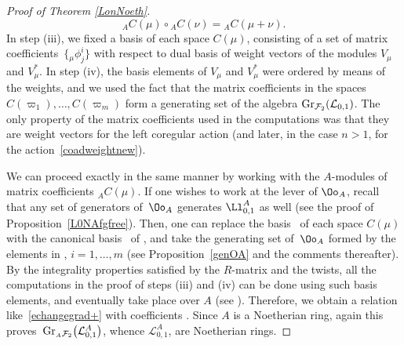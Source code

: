 \begin{proof}[Proof of Theorem \ref{LonNoeth}]
\[%
{}_AC(\mu) \circ{}_AC(\nu) = {}_AC(\mu + \nu).
\]
In step (iii), we fixed a basis of each space $C(\mu)$, consisting of a set of matrix coefficients~$\big\{{}_\mu\phi^i_j\big\}$ with respect to dual basis of weight vectors of the modules $V_\mu$ and $V_\mu^*$. In step (iv), the basis elements of $V_\mu$ and $V_\mu^*$ were ordered by means of the weights, and we used the fact that the matrix coefficients in the spaces $C(\varpi_1),\dots,C(\varpi_m)$ form a generating set of the algebra $ {\rm Gr}_{\mathcal{F}_2}({\mathcal L}_{0,1})$. The only property of the matrix coefficients used in the computations was that they are weight vectors for the left coregular action (and later, in the case $n>1$, for the action~\eqref{coadweightnew}).

We can proceed exactly in the same manner by working with the $A$-modules of matrix coefficients ${}_AC(\mu)$. If one wishes to work at the lever of $\Oo_A$, recall that any set of generators of~$\Oo_A$ generates $\Ll_{0,1}^A$ as well (see the proof of Proposition~\ref{L0NAfgfree}). Then, one can replace the basis~ of each space $C(\mu)$ with the canonical basis~ of , and take the generating set of~$\Oo_A$ formed by the elements in , $i=1,\dots,m$ (see Proposition~\ref{genOA} and the comments thereafter). By the integrality properties satisfied by the $R$-matrix and the twists, all the computations in the proof of steps (iii) and (iv) can be done using such basis elements, and eventually take place over $A$ (see \cite[Propositions 4.10 and 6.9]{BR}). Therefore, we obtain a relation like~\eqref{echangegrad+} with coefficients . Since $A$ is a Noetherian ring, again this proves~${ {\rm Gr}_{ {}_A\mathcal{F}_2}\big({\mathcal L}_{0,1}^A\big)}$, whence ${\mathcal L}_{0,1}^A$, are Noetherian rings.


\end{proof}
